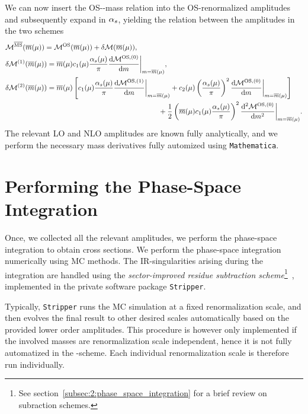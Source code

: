 We can now insert the \acs{OS}-\MS-mass relation into the \acs{OS}-renormalized amplitudes and subsequently expand in $\alpha_s$, yielding the relation between the amplitudes in the two schemes
\begin{equation}
\begin{split}
  & \mathcal{M}^{\overline{\text{MS}}}(\overline{m}(\mu)) = \mathcal{M}^{\text{OS}}(\overline{m}(\mu)) + \delta \mathcal{M} (\overline{m}(\mu)), \\
  & \delta \mathcal{M}^{(1)} (\overline{m}(\mu)) = \overline{m}(\mu)c_1(\mu) \frac{\alpha_s(\mu)}{\pi}\frac{\mathrm{d} \mathcal{M}^{\text{OS},(0)}}{\mathrm{d} m} \bigg \vert_{m = \overline{m}(\mu)} , \\
  & \delta \mathcal{M}^{(2)} (\overline{m}(\mu)) = \overline{m}(\mu) \left[ c_1(\mu) \frac{\alpha_s(\mu)}{\pi} \frac{\mathrm{d} \mathcal{M}^{\text{OS},(1)}}{\mathrm{d} m}\bigg \vert_{m = \overline{m}(\mu)}  + c_2(\mu) \left(\frac{\alpha_s(\mu)}{\pi}\right)^2 \frac{\mathrm{d}\mathcal{M}^{\text{OS},(0)}}{\mathrm{d}m}\bigg \vert_{m = \overline{m}(\mu)}  \right] \\
  & \hspace{7.5cm}+ \frac{1}{2}\left(\overline{m}(\mu) c_1(\mu) \frac{\alpha_s(\mu)}{\pi} \right)^2 \frac{\mathrm{d}^2 \mathcal{M}^{\text{OS},(0)}}{\mathrm{d} m^2} \bigg \vert_{m = \overline{m}(\mu)} .
\end{split}
\label{eq:5:MMS_to_MOS}
\end{equation}
The relevant \acs{LO} and \acs{NLO} amplitudes are known fully analytically, and we perform the necessary mass derivatives fully automized using \texttt{Mathematica}.


\section{Performing the Phase-Space Integration}
Once, we collected all the relevant amplitudes, we perform the phase-space integration to obtain cross sections. We perform the phase-space integration numerically using \acs{MC} methods. The \acs{IR}-singularities arising during the integration are handled using the \textit{sector-improved residue subtraction scheme}\footnote{See section~\ref{subsec:2:phase_space_integration} for a brief review on subraction schemes.}~\cite{Czakon:2010td}, implemented in the private software package \texttt{Stripper}.

Typically, \texttt{Stripper} runs the \acs{MC} simulation at a fixed renormalization scale, and then evolves the final result to other desired scales automatically based on the provided lower order amplitudes. This procedure is however only implemented if the involved masses are renormalization scale independent, hence it is not fully automatized in the \MS-scheme. Each individual renormalization scale is therefore run individually.

